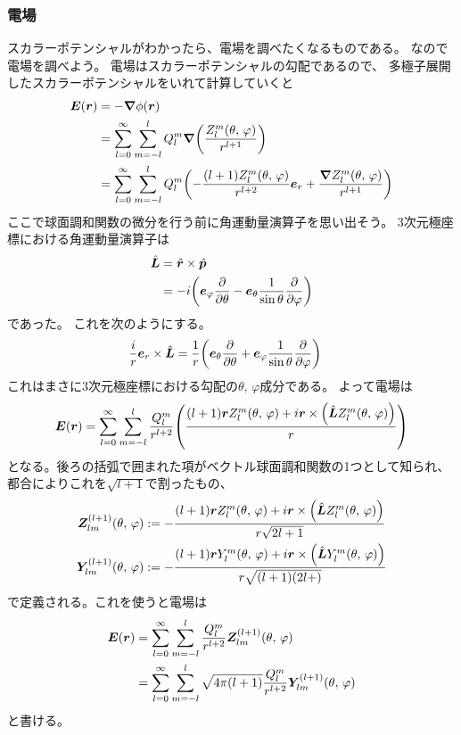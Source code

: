 \documentclass[../../master.tex]{subfiles}
\begin{document}
\subsubsection*{電場}
スカラーポテンシャルがわかったら、電場を調べたくなるものである。
なので電場を調べよう。
電場はスカラーポテンシャルの勾配であるので、
多極子展開したスカラーポテンシャルをいれて計算していくと
\begin{align}
    \vb*{E}(\vb*{r}) &= -\grad \phi(\vb*{r})\\
    &= \sum_{l=0}^{\infty} \sum_{m=-l}^{l} Q_l^m \grad\qty(\frac{Z_l^m(\theta,\,\varphi)}{r^{l+1}})\\
    &= \sum_{l=0}^{\infty} \sum_{m=-l}^{l} Q_l^m \qty(-\frac{(l+1)Z_l^m(\theta,\,\varphi)}{r^{l+2}}\vb*{e}_r+\frac{\grad Z_l^m(\theta,\,\varphi)}{r^{l+1}})\\
\end{align}
ここで球面調和関数の微分を行う前に角運動量演算子を思い出そう。
3次元極座標における角運動量演算子は
\begin{align}
    \hat{\vb*{L}} &= \hat{\vb*{r}} \times \hat{\vb*{p}}\\
    &= -i\qty(\vb*{e}_\varphi \pdv{\theta} -\vb*{e}_\theta \frac{1}{\sin\theta}\pdv{\varphi})
\end{align}
であった。
これを次のようにする。
\begin{align}
    \frac{i}{r}\vb*{e}_r \times \hat{\vb*{L}} &= \frac{1}{r}\qty(\vb*{e}_\theta \pdv{\theta} +\vb*{e}_\varphi \frac{1}{\sin\theta}\pdv{\varphi})
\end{align}
これはまさに3次元極座標における勾配の\(\theta,\,\varphi\)成分である。
よって電場は
\begin{equation}
    \vb*{E}(\vb*{r}) = \sum_{l=0}^{\infty} \sum_{m=-l}^{l}\frac{Q_l^m}{r^{l+2}}
    \qty(\frac{(l+1)\vb*{r}Z_l^m(\theta,\,\varphi)+i\vb*{r}\times\qty(\hat{\vb*{L}}Z_l^m(\theta,\,\varphi))}{r})
\end{equation}
となる。後ろの括弧で囲まれた項がベクトル球面調和関数の1つとして知られ、
都合によりこれを\(\sqrt{l+1}\)で割ったもの、
\begin{align}
    \vb*{Z}_{lm}^{(l+1)}(\theta,\,\varphi) &:=-\frac{(l+1)\vb*{r}Z_l^m(\theta,\,\varphi)+i\vb*{r}\times\qty(\hat{\vb*{L}}Z_l^m(\theta,\,\varphi))}{r\sqrt{2l+1}}\\
    \vb*{Y}_{lm}^{(l+1)}(\theta,\,\varphi) &:=-\frac{(l+1)\vb*{r}Y_l^m(\theta,\,\varphi)+i\vb*{r}\times\qty(\hat{\vb*{L}}Y_l^m(\theta,\,\varphi))}{r\sqrt{(l+1)(2l+)}}\\
\end{align}
で定義される。これを使うと電場は
\begin{align}
    \vb*{E}(\vb*{r})
    &= \sum_{l=0}^{\infty} \sum_{m=-l}^{l}\frac{Q_l^m}{r^{l+2}} \vb*{Z}_{lm}^{(l+1)}(\theta,\,\varphi)\\
    &= \sum_{l=0}^{\infty} \sum_{m=-l}^{l}\sqrt{4\pi(l+1)}\frac{Q_l^m}{r^{l+2}} \vb*{Y}_{lm}^{(l+1)}(\theta,\,\varphi)\\
\end{align}
と書ける。
\end{document}
